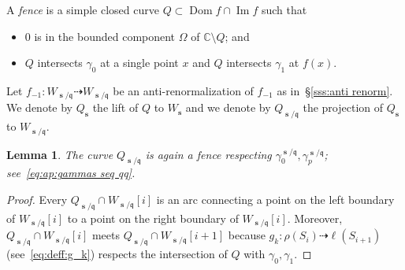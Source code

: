\documentclass[]{amsart}
\newcommand{\Dom}{\operatorname {Dom}}
\renewcommand{\Im}{\operatorname {Im}}
\newcommand\seq{{\operatorname{\mathbf s}}}
\renewcommand{\qq}{\mathfrak{q}}
\newcommand\wall{{Q}}
\newcommand\inn{{\Omega}}
\newcommand{\C}{\mathbb{C}}
\newtheorem{lem}[thm]{Lemma}
\theoremstyle{remark}
\numberwithin{equation}{section}
\theoremstyle{definition}
\begin{document}
A \emph{fence} is a simple closed curve $\wall\subset \Dom f\cap \Im f$ such that
\begin{itemize}
\item $0$ is in the bounded component $\inn$ of $\C\setminus \wall$; and
\item $\wall$ intersects $\gamma_0$ at a single point $x$ and  $\wall$ intersects $\gamma_1$ at $f(x)$.
\end{itemize}

Let $f_{-1}\colon W_{\seq/\qq}\dashrightarrow W_{\seq/\qq}$ be an anti-renormalization of $f_{-1}$ as in~\S\ref{sss:anti renorm}. We denote by $\wall_\seq$ the lift of $\wall$ to $W_\seq$ and we denote by $\wall_{\seq/\qq}$ the projection of $\wall_\seq$ to $W_{\seq/\qq}$.

\begin{lem}
\label{lem:lift of  fence}
The curve $\wall_{\seq/\qq}$ is again a fence respecting $\gamma_0^{\seq/\qq}, \gamma_p^{\seq/\qq}$; see~\eqref{eq:ap:gammas seq qq}.
\end{lem}
\begin{proof}
Every $\wall_{\seq/\qq}\cap W_{\seq/\qq}[i]$ is an arc connecting a point on the left boundary of $W_{\seq/\qq}[i]$ to a point on the right boundary of $W_{\seq/\qq}[i]$. Moreover,  $\wall_{\seq/\qq}\cap W_{\seq/\qq}[i]$ meets  $\wall_{\seq/\qq}\cap W_{\seq/\qq}[i+1]$ because $g_k\colon \rho(S_i)\dashrightarrow \ell(S_{i+1})$ (see~\eqref{eq:deff:g_k}) respects the intersection of $\wall$ with $\gamma_0,\gamma_1$.
\end{proof}
\end{document}
